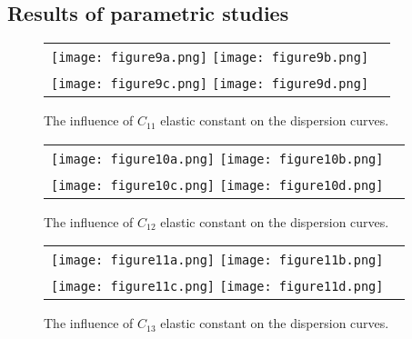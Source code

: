 \documentclass[]{spie}  %
\newcommand{\myfigscale}{0.9}
\begin{document}
\subsection{Results of parametric studies}


\begin{figure} [ht]
	\begin{center}
		\begin{tabular}{cc} %
			\texttt{[image: figure9a.png]}
			\texttt{[image: figure9b.png]}\\
			\texttt{[image: figure9c.png]}
			\texttt{[image: figure9d.png]}
		\end{tabular}
	\end{center}
	\caption[] 
	{ \label{fig:C11} 
		The influence of \(C_{11}\) elastic constant on the dispersion curves.}
\end{figure} 

\begin{figure} [ht]
	\begin{center}
		\begin{tabular}{cc} %
			\texttt{[image: figure10a.png]}
			\texttt{[image: figure10b.png]}\\
			\texttt{[image: figure10c.png]}
			\texttt{[image: figure10d.png]}
		\end{tabular}
	\end{center}
	\caption[] 
	{ \label{fig:C12} 
		The influence of \(C_{12}\) elastic constant on the dispersion curves.}
\end{figure} 

\begin{figure} [ht]
	\begin{center}
		\begin{tabular}{cc} %
			\texttt{[image: figure11a.png]}
			\texttt{[image: figure11b.png]}\\
			\texttt{[image: figure11c.png]}
			\texttt{[image: figure11d.png]}
		\end{tabular}
	\end{center}
	\caption[] 
	{ \label{fig:C13} 
		The influence of \(C_{13}\) elastic constant on the dispersion curves.}
\end{figure} 
\end{document}
